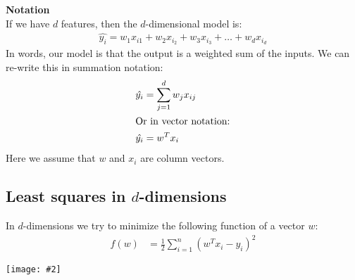 \documentclass{article}
\def\blu#1{{\color{blu}#1}}
\theoremstyle{definition}
\newcommand{\centerfig}[2]{\begin{center}\texttt{[image: \#2]}\end{center}}
\begin{document}
\noindent \textbf{Notation}\\
If we have $ d $ features, then the \blu{$ d $-dimensional model} is:
\begin{align*}
\hat{y_i} = w_1x_{i1} + w_2x_{i_2} + w_3x_{i_3} + \dots + w_dx_{i_d}
\end{align*}
In words, our \blu{model is that the output is a weighted sum of the inputs}.
We can re-write this in summation notation:
\begin{align*}
\hat{y_i} &= \sum_{j = 1}^{d}w_jx_{ij} \\
\intertext{Or in vector notation:}
\hat{y_i} &=w^Tx_i
\end{align*}
Here we assume that $ w$ and $ x_i $ are column vectors. 

\endgroup


\subsection*{Least squares in $ d $-dimensions}
In $ d $-dimensions we try to minimize the following function of a vector $ w $:
\begin{align*}
f(w) &= \frac{1}{2}\sum_{i = 1}^{n}(w^Tx_i - y_i)^2
\end{align*}
\centerfig{0.80}{Pic33}
\end{document}
